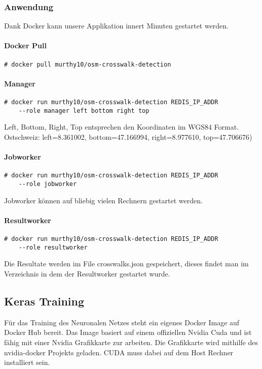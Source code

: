 \newpage
\subsubsection{Anwendung}
Dank Docker kann unsere Applikation innert Minuten gestartet werden.

\paragraph{Docker Pull}
\begin{lstlisting}[style=BashInputStyle]
	# docker pull murthy10/osm-crosswalk-detection
\end{lstlisting}

\paragraph{Manager}
\begin{lstlisting}[style=BashInputStyle]
	# docker run murthy10/osm-crosswalk-detection REDIS_IP_ADDR 
 	--role manager left bottom right top
\end{lstlisting}
Left, Bottom, Right, Top entsprechen den Koordinaten im WGS84 Format. \\
Ostschweiz: left=8.361002, bottom=47.166994, right=8.977610, top=47.706676) 

\paragraph{Jobworker}
\begin{lstlisting}[style=BashInputStyle]
	# docker run murthy10/osm-crosswalk-detection REDIS_IP_ADDR 
 	--role jobworker
\end{lstlisting}
Jobworker können auf bliebig vielen Rechnern gestartet werden.\\

\paragraph{Resultworker}
\begin{lstlisting}[style=BashInputStyle]
	# docker run murthy10/osm-crosswalk-detection REDIS_IP_ADDR 
 	--role resultworker
\end{lstlisting}
Die Resultate werden im File crosswalks.json gespeichert, dieses findet man im Verzeichnis in dem der Resultworker gestartet wurde.
\newpage

\subsection{Keras Training}
Für das Training des Neuronalen Netzes steht ein eigenes Docker Image \cite{DokerKeras} auf Docker Hub bereit. Das Image basiert auf einem offiziellen Nvidia Cuda und ist fähig mit einer Nvidia Grafikkarte zur arbeiten. Die Grafikkarte wird mithilfe des nvidia-docker Projekts geladen. CUDA muss dabei auf dem Host Rechner installiert sein.



